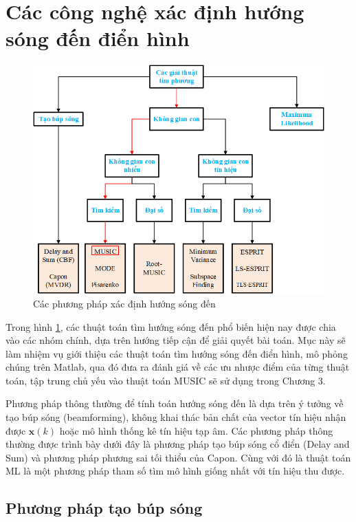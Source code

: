\section{Các công nghệ xác định hướng sóng đến điển hình}

\begin{figure} [h]
	\centering
	\includegraphics[width= 1\linewidth]{figures/DOA_algorithm.png}
	\caption{Các phương pháp xác định hướng sóng đến}
	\label{fig:overview}
\end{figure}

Trong hình \ref{fig:overview}, các thuật toán tìm hướng sóng đến phổ biến hiện nay được chia vào các nhóm chính, dựa trên hướng tiếp cận để giải quyết bài toán. Mục này sẽ làm nhiệm vụ giới thiệu các thuật toán tìm hướng sóng đến điển hình, mô phỏng chúng trên Matlab, qua đó đưa ra đánh giá về các ưu nhược điểm của từng thuật toán, tập trung chủ yếu vào thuật toán MUSIC sẽ sử dụng trong Chương 3.

Phương pháp thông thường để tính toán hướng sóng đến là dựa trên ý tưởng về tạo búp sóng (beamforming), không khai thác bản chất của vector tín hiệu nhận được $\mathbf{x}(k)$ hoặc mô hình thống kê tín hiệu tạp âm. Các phương pháp thông thường được trình bày dưới đây là phương pháp tạo búp sóng cổ điển (Delay and Sum) và phương pháp phương sai tối thiểu của Capon. Cùng với đó là thuật toán ML là một phương pháp tham số tìm mô hình giống nhất với tín hiệu thu được.

\subsection{Phương pháp tạo búp sóng}

